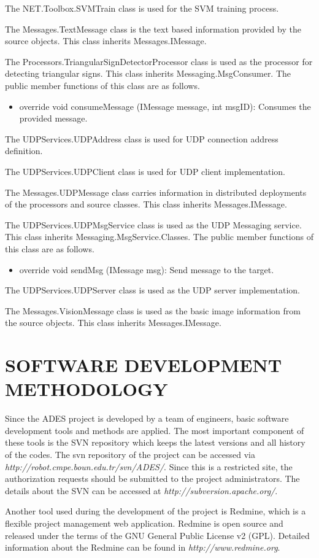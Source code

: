 \documentclass[a4paper,oneside,12pt]{report}
\begin{document}
The NET.Toolbox.SVMTrain class is used for the SVM training process. 

The Messages.TextMessage class is the text based information provided by the source objects.
This class inherits Messages.IMessage.

The Processors.TriangularSignDetectorProcessor class is used as the processor for detecting triangular signs.
This class inherits Messaging.MsgConsumer. The public member functions of this class are as follows.
\begin{itemize}
\item override void consumeMessage (IMessage message, int msgID): Consumes the provided message. 
\end{itemize}

The UDPServices.UDPAddress class is used for UDP connection address definition. 

The UDPServices.UDPClient class is used for UDP client implementation. 

The Messages.UDPMessage class carries information in distributed deployments of the processors and source classes.
This class inherits Messages.IMessage.

The UDPServices.UDPMsgService class is used as the UDP Messaging service.
This class inherits Messaging.MsgService.Classes. The public member functions of this class are as follows.
\begin{itemize}
\item override void sendMsg (IMessage msg): Send message to the target. 
\end{itemize}

The UDPServices.UDPServer class is used as the UDP server implementation. 

The Messages.VisionMessage class is used as the basic image information from the source objects.
This class inherits Messages.IMessage.


\section{SOFTWARE DEVELOPMENT METHODOLOGY}
Since the ADES project is developed by a team of engineers, basic software development tools and methods are applied. The most important component of these tools is the SVN repository which keeps the latest versions and all history of the codes. The svn repository of the project can be accessed via \textit{http://robot.cmpe.boun.edu.tr/svn/ADES/}. Since this is a restricted site, the authorization requests should be submitted to the project administrators. The details about the SVN can be accessed at \textit{http://subversion.apache.org/}.

Another tool used during the development of the project is Redmine, which is a flexible project management web application. Redmine is open source and released under the terms of the GNU General Public License v2 (GPL). Detailed information about the Redmine can be found in \textit{http://www.redmine.org}.


	
\end{document}
